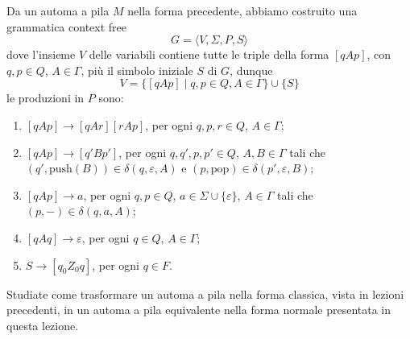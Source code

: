 \documentclass[12pt, answers]{exam}
\begin{document}
Da un automa a pila $M$ nella forma precedente, abbiamo costruito una grammatica context free
$$ G = \langle V, \Sigma, P, S \rangle $$
dove l'insieme $V$ delle variabili contiene tutte le triple della forma $[qAp]$, con $q, p \in Q$, $A \in \Gamma$, più il simbolo iniziale $S$ di $G$, dunque
$$ V = \{[qAp] \mid q, p \in Q, A \in \Gamma\} \cup \{S\} $$
le produzioni in $P$ sono:
\begin{enumerate}[label=\alph*.]
	\item $[qAp] \rightarrow [qAr][rAp]$, per ogni $q, p, r \in Q$, $A \in \Gamma$;
	\item $[qAp] \rightarrow [q'Bp']$, per ogni $q, q', p, p' \in Q$, $A, B \in \Gamma$ tali che $(q', \text{push}(B)) \in \delta(q, \varepsilon, A)$ e $(p, \text{pop}) \in \delta(p', \varepsilon, B)$;
	\item $[qAp] \rightarrow a$, per ogni $q, p \in Q$, $a \in \Sigma \cup \{\varepsilon\}$, $A \in \Gamma$ tali che $(p, -) \in \delta(q, a, A)$;
	\item $[qAq] \rightarrow \varepsilon$, per ogni $q \in Q$, $A \in \Gamma$;
	\item $S \rightarrow [q_0Z_0q]$, per ogni $q \in F$.
\end{enumerate}
\begin{questions}
	\question Studiate come trasformare un automa a pila nella forma classica, vista in lezioni precedenti, in un automa a pila equivalente nella forma normale presentata in questa lezione.
	\begin{solution}
	\end{solution}
\end{questions}
\end{document}

